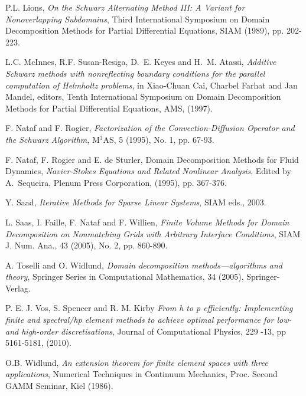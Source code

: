 \documentclass[final]{siamltex}
\begin{document}
\begin{thebibliography}{10}
 {\sc P.L. Lions}, {\em On the Schwarz Alternating
  Method III: A Variant for Nonoverlapping Subdomains}, Third
  International Symposium on Domain Decomposition Methods for Partial
  Differential Equations, SIAM (1989), pp. 202-223.

 {\sc L.C. McInnes, R.F. Susan-Resiga, D.~E. Keyes and
  H.~M. Atassi}, {\em Additive Schwarz methods with nonreflecting
  boundary conditions for the parallel computation of Helmholtz
  problems}, in Xiao-Chuan Cai, Charbel Farhat and Jan Mandel,
  editors, Tenth International Symposium on Domain Decomposition
  Methods for Partial Differential Equations, AMS, (1997).
  
   {\sc F. Nataf and F. Rogier}, {\em Factorization of
  the Convection-Diffusion Operator and the Schwarz Algorithm},
  M${}^3$AS, 5 (1995), No. 1, pp. 67-93.

   {\sc F. Nataf, F. Rogier and E. de Sturler}, Domain
  Decomposition Methods for Fluid Dynamics, {\em Navier-Stokes
    Equations and Related Nonlinear Analysis}, Edited by A.~Sequeira,
  Plenum Press Corporation, (1995), pp. 367-376.

   {\sc Y. Saad}, {\em
  Iterative Methods for Sparse Linear Systems}, SIAM eds., 2003.

   {\sc L. Saas, I. Faille, F. Nataf and F. Willien}, {\em
  Finite Volume Methods for Domain Decomposition on Nonmatching Grids
  with Arbitrary Interface Conditions}, SIAM J. Num. Ana., 43 (2005),
  No. 2, pp. 860-890.
  
 {\sc A. Toselli and O. Widlund}, {\em Domain
  decomposition methods---algorithms and theory}, Springer Series in
  Computational Mathematics, 34 (2005), Springer-Verlag.

 {\sc P. E. J. Vos, S. Spencer and R. M. Kirby} {\em From h to p efficiently: Implementing finite and
  spectral/hp element methods to achieve optimal performance for low- and high-order discretisations},
Journal of Computational Physics, 229 -13, pp 5161-5181, (2010).

 {\sc O.B. Widlund}, {\em An extension theorem for
  finite element spaces with three applications}, Numerical Techniques
  in Continuum Mechanics, Proc. Second GAMM Seminar, Kiel (1986).
   
\end{thebibliography}
\end{document}
